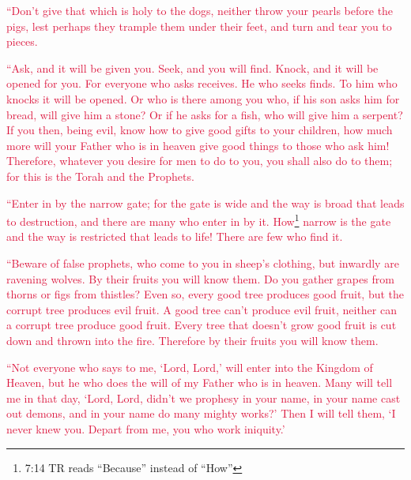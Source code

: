 \myverse{}\textcolor{crimson}{“Don’t give that which is holy to the dogs, neither throw your
	pearls before the pigs, lest perhaps they trample them under their feet, and turn and tear you to pieces.}

\myverse{}\textcolor{crimson}{“Ask, and it will be given you. Seek, and you will find. Knock,
	and it will be opened for you.
}
\myverse{}\textcolor{crimson}{For everyone who asks receives. He who seeks finds. To him who knocks it
	will be opened.
}
\myverse{}\textcolor{crimson}{Or who is there among you who, if his son asks him for bread, will give
	him a stone?
}
\myverse{}\textcolor{crimson}{Or if he asks for a fish, who will give him a serpent?} \myverse{}\textcolor{crimson}{If you then, being evil, know how to give good gifts to your children,	how much more will your Father who is in heaven give good things to those who ask him!} \myverse{}\textcolor{crimson}{Therefore, whatever you desire for men to do to you, you shall also do to them; for this is the Torah and the Prophets.}

\myverse{}\textcolor{crimson}{“Enter in by the narrow gate; for the gate is wide and the
	way is broad that leads to destruction, and there are many who enter in by it.
}
\myverse{}\textcolor{crimson}{How}\footnote{7:14 TR reads “Because” instead of “How”}
\textcolor{crimson}{narrow is the gate and the way is restricted that leads to life! There are few who find it.}

\myverse{}\textcolor{crimson}{“Beware of false prophets, who come to you in sheep’s clothing,
	but inwardly are ravening wolves.
}
\myverse{}\textcolor{crimson}{By their fruits you will know them. Do you gather grapes from thorns or
	figs from thistles?
}
\myverse{}\textcolor{crimson}{Even so, every good tree produces good fruit, but the corrupt tree produces
	evil fruit.
}
\myverse{}\textcolor{crimson}{A good tree can’t produce evil fruit, neither can a corrupt tree produce
	good fruit.
}
\myverse{}\textcolor{crimson}{Every tree that doesn’t grow good fruit is cut down and thrown into the
	fire.
}
\myverse{}\textcolor{crimson}{Therefore by their fruits you will know them.
}

\myverse{}\textcolor{crimson}{“Not everyone who says to me, ‘Lord, Lord,’ will enter into
	the Kingdom of Heaven, but he who does the will of my Father who is in heaven.
}
\myverse{}\textcolor{crimson}{Many will tell me in that day, ‘Lord, Lord, didn’t we prophesy in your
	name, in your name cast out demons, and in your name do many mighty works?’
}
\myverse{}\textcolor{crimson}{Then I will tell them, ‘I never knew you. Depart from me, you who work
	iniquity.’}

